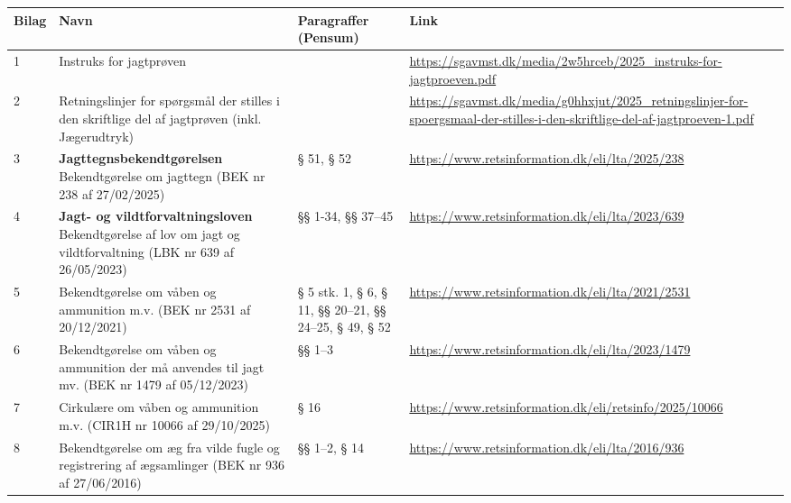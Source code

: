 \documentclass[10pt,a4paper]{article}
\begin{document}
{\footnotesize %
\setlength{\tabcolsep}{4pt} %
\renewcommand{\arraystretch}{1.3} %

\centering
\begin{tabular}{|P{1.2cm}|P{5.5cm}|P{3.5cm}|P{6.5cm}|}
\hline
\textbf{Bilag} & \textbf{Navn} & \textbf{Paragraffer (Pensum)} & \textbf{Link} \\
\hline

1 & Instruks for jagtprøven & & \url{https://sgavmst.dk/media/2w5hrceb/2025_instruks-for-jagtproeven.pdf} \\
\hline

2 & Retningslinjer for spørgsmål der stilles i den skriftlige del af jagtprøven (inkl. Jægerudtryk) & & \url{https://sgavmst.dk/media/g0hhxjut/2025_retningslinjer-for-spoergsmaal-der-stilles-i-den-skriftlige-del-af-jagtproeven-1.pdf} \\
\hline

3 & \textbf{Jagttegnsbekendtgørelsen} Bekendtgørelse om jagttegn (BEK nr 238 af 27/02/2025) & § 51, § 52 & \url{https://www.retsinformation.dk/eli/lta/2025/238}
\\
\hline

4 & \textbf{Jagt- og vildtforvaltningsloven} Bekendtgørelse af lov om jagt og vildtforvaltning (LBK nr 639 af 26/05/2023) & §§ 1-34, §§ 37–45  & \url{https://www.retsinformation.dk/eli/lta/2023/639} \\
\hline

5 & Bekendtgørelse om våben og ammunition m.v. (BEK nr 2531 af 20/12/2021) & § 5 stk. 1, § 6, § 11, §§ 20–21, §§ 24–25, § 49, § 52 & \url{https://www.retsinformation.dk/eli/lta/2021/2531} \\
\hline

6 & Bekendtgørelse om våben og ammunition der må anvendes til jagt mv. (BEK nr 1479 af 05/12/2023) & §§ 1–3 & \url{https://www.retsinformation.dk/eli/lta/2023/1479} \\
\hline

7 & Cirkulære om våben og ammunition m.v. (CIR1H nr 10066 af 29/10/2025) & § 16 & \url{https://www.retsinformation.dk/eli/retsinfo/2025/10066} \\
\hline

8 & Bekendtgørelse om æg fra vilde fugle og registrering af ægsamlinger (BEK nr 936 af 27/06/2016)  & §§ 1–2, § 14 & \url{https://www.retsinformation.dk/eli/lta/2016/936} \\
\hline


\end{tabular}}
\end{document}
